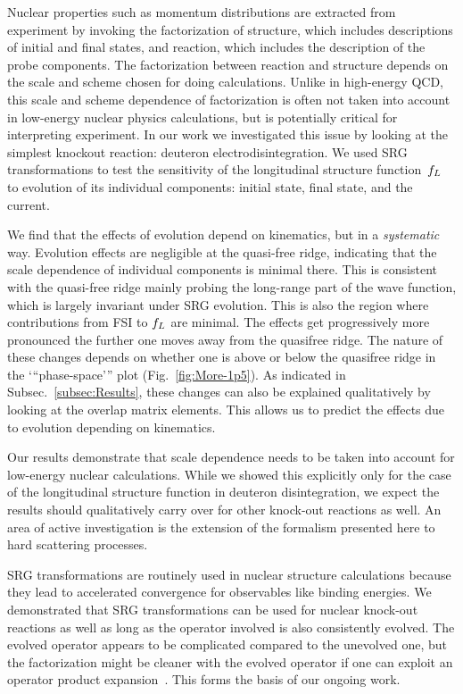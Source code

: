 	Nuclear properties such as momentum distributions are extracted from
	experiment by invoking the factorization of structure, which includes
	descriptions of	initial and final states, and reaction, which includes the
	description of the probe components.
	The factorization between reaction and structure depends on the scale and
	scheme chosen for doing calculations.  Unlike in high-energy QCD, this scale
	and scheme dependence of factorization is often not taken into account in
	low-energy nuclear physics calculations, but is potentially critical for
	interpreting experiment.
	In our work we investigated this issue by looking at the simplest knockout
	reaction: deuteron electrodisintegration.  We used SRG transformations to test
	the sensitivity of the longitudinal structure function~$f_L$ to evolution of
	its	individual components: initial state, final state, and the current.

	We find that the effects of evolution depend on kinematics,
	but in a \emph{systematic} way.  Evolution effects are negligible at the
	quasi-free ridge,	indicating that the
	scale dependence of individual components is minimal there.  This is
	consistent with the quasi-free ridge mainly probing the long-range part of
	the	wave function, which is largely invariant under SRG evolution.  This is
	also the region where contributions from FSI to $f_L$ are minimal.
	The effects get progressively more pronounced the further one moves away from
	the quasifree ridge.  The nature of these changes depends on whether one
	is above or below the quasifree ridge in the ‘“phase-space’” plot
	(Fig.~\ref{fig:More-1p5}).
	As indicated in Subsec.~\ref{subsec:Results}, these changes can also be
	explained qualitatively
	by looking at the overlap matrix elements.  This allows us to predict the
	effects due to evolution depending on kinematics.

	Our results demonstrate that scale dependence needs to be taken into account
	for low-energy nuclear calculations.  While we showed this explicitly only
	for	the case of the longitudinal structure function in deuteron
	disintegration,	we expect the results should qualitatively
	carry over for other knock-out reactions as well.
	An area of active investigation is the extension of the formalism presented
	here to hard scattering processes.


	SRG transformations are routinely used in nuclear structure calculations
	because	they lead to accelerated convergence for observables like binding
	energies.  We
	demonstrated that SRG transformations can be used for nuclear knock-out
	reactions as well as long as the operator involved is also consistently
	evolved. 	The evolved operator appears to be complicated compared to the
	unevolved one,
	but the factorization might be cleaner with the evolved operator if one can
	exploit an operator product expansion~\cite{Anderson:2010aq,Bogner:2012zm}.
	This forms the basis of our ongoing work.

